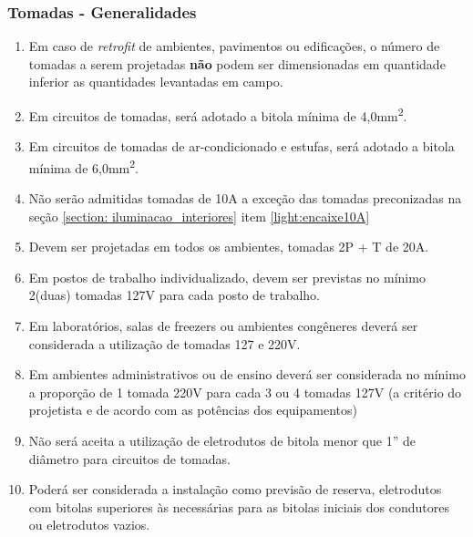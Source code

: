 \subsubsection{Tomadas - Generalidades}\label{section: socket-general}

\begin{enumerate}
		
	\item Em caso de \textit{retrofit} de ambientes, pavimentos ou edificações, o número de tomadas a serem projetadas \textbf{não} podem ser dimensionadas em quantidade inferior as quantidades levantadas em campo.
	
	\item \label{socket: bitola minima} Em circuitos de tomadas, será adotado a bitola mínima de 4,0mm\textsuperscript{2}.
	
	\item \label{socket: bitola minima ar} Em circuitos de tomadas de ar-condicionado e estufas, será adotado a bitola mínima de 6,0mm\textsuperscript{2}.
	
	\item Não serão admitidas tomadas de 10A a exceção das tomadas preconizadas na seção \ref*{section: iluminacao_interiores} item \ref*{light:encaixe10A}
	
	\item Devem ser projetadas em todos os ambientes, tomadas 2P + T de 20A.
	
	\item Em postos de trabalho individualizado, devem ser previstas no mínimo 2(duas) tomadas 127V para cada posto de trabalho.
	
	\item Em laboratórios, salas de freezers ou ambientes congêneres deverá ser considerada a utilização de tomadas 127 e 220V.
	
	\item Em ambientes administrativos ou de ensino deverá ser considerada no mínimo a proporção de 1 tomada 220V para cada 3 ou 4 tomadas 127V (a critério do projetista e de acordo com as potências dos equipamentos)
	
	\item Não será aceita a utilização de eletrodutos de bitola menor que 1” de diâmetro para circuitos de tomadas.
	
	\item Poderá ser considerada a instalação como previsão de reserva, eletrodutos com bitolas superiores às necessárias para as bitolas iniciais dos condutores ou eletrodutos vazios.
	

\end{enumerate}
